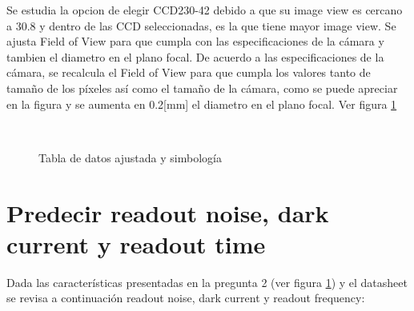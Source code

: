 \documentclass[a4paper,10pt]{article}
\begin{document}
Se estudia la opcion de elegir CCD230-42 debido a que su image view es cercano
a 30.8 y dentro de las CCD seleccionadas, es la que tiene mayor image view. Se
ajusta Field of View para que cumpla con las especificaciones de la cámara y
tambien el diametro en el plano focal. De acuerdo a las especificaciones de la
cámara, se recalcula el Field of View para que cumpla los valores tanto de
tamaño de los píxeles así como el tamaño de la cámara, como se puede apreciar
en la figura y se aumenta en 0.2[mm] el diametro en el plano focal.
Ver figura \ref{fig:p2}
\begin{figure}[ht!]
  \centering
  ~ 
  ~ 
  \caption{Tabla de datos ajustada y simbología}
  \label{fig:p2}
\end{figure}

\section{Predecir readout noise, dark current y readout time}
Dada las características presentadas en la pregunta 2 (ver figura \ref{fig:p2})
y el datasheet se revisa a continuación readout noise, dark current y readout
frequency:
\end{document}
